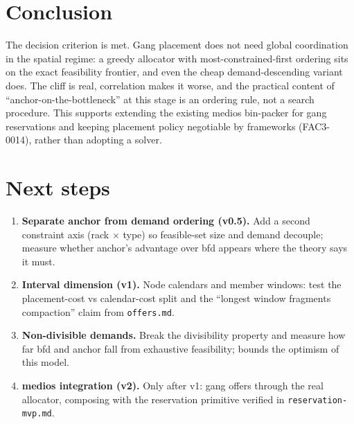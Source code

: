 \documentclass[11pt]{article}
\newcommand{\code}[1]{\texttt{#1}}
\begin{document}
\section{Conclusion}

The decision criterion is met. Gang placement does not need global
coordination in the spatial regime: a greedy allocator with
most-constrained-first ordering sits on the exact feasibility frontier, and
even the cheap demand-descending variant does. The cliff is real,
correlation makes it worse, and the practical content of
``anchor-on-the-bottleneck'' at this stage is an ordering rule, not a
search procedure. This supports extending the existing medios bin-packer
for gang reservations and keeping placement policy negotiable by frameworks
(FAC3-0014), rather than adopting a solver.

\section{Next steps}

\begin{enumerate}
\item \textbf{Separate anchor from demand ordering (v0.5).} Add a second
  constraint axis (rack $\times$ type) so feasible-set size and demand
  decouple; measure whether anchor's advantage over bfd appears where the
  theory says it must.
\item \textbf{Interval dimension (v1).} Node calendars and member windows:
  test the placement-cost vs calendar-cost split and the ``longest window
  fragments compaction'' claim from \code{offers.md}.
\item \textbf{Non-divisible demands.} Break the divisibility property and
  measure how far bfd and anchor fall from exhaustive feasibility; bounds
  the optimism of this model.
\item \textbf{medios integration (v2).} Only after v1: gang offers through
  the real allocator, composing with the reservation primitive verified in
  \code{reservation-mvp.md}.
\end{enumerate}
\end{document}
